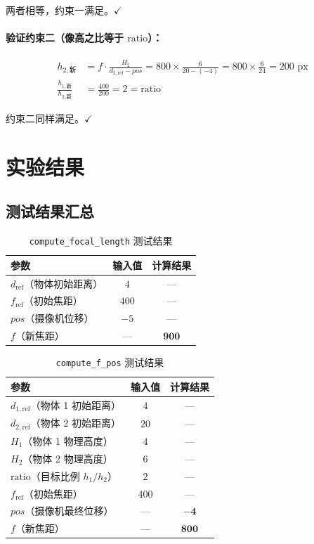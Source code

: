 \documentclass[12pt,a4paper]{ctexart}
\begin{document}
两者相等，约束一满足。$\checkmark$

\paragraph{验证约束二（像高之比等于 $\text{ratio}$）：}

\begin{align}
  h_{2,\text{新}} &= f \cdot \frac{H_2}{d_{2,\text{ref}} - pos} = 800 \times \frac{6}{20-(-4)} = 800 \times \frac{6}{24} = 200 \text{ px} \\
  \frac{h_{1,\text{新}}}{h_{2,\text{新}}} &= \frac{400}{200} = 2 = \text{ratio}
\end{align}

约束二同样满足。$\checkmark$

\section{实验结果}

\subsection{测试结果汇总}

\begin{table}[H]
\centering
\caption{\texttt{compute\_focal\_length} 测试结果}
\label{tab:result1}
\begin{tabular}{lcc}
\toprule
参数 & 输入值 & 计算结果 \\
\midrule
$d_\text{ref}$（物体初始距离） & $4$ & — \\
$f_\text{ref}$（初始焦距） & $400$ & — \\
$pos$（摄像机位移） & $-5$ & — \\
$f$（新焦距） & — & $\mathbf{900}$ \\
\bottomrule
\end{tabular}
\end{table}

\begin{table}[H]
\centering
\caption{\texttt{compute\_f\_pos} 测试结果}
\label{tab:result2}
\begin{tabular}{lcc}
\toprule
参数 & 输入值 & 计算结果 \\
\midrule
$d_{1,\text{ref}}$（物体 1 初始距离） & $4$ & — \\
$d_{2,\text{ref}}$（物体 2 初始距离） & $20$ & — \\
$H_1$（物体 1 物理高度） & $4$ & — \\
$H_2$（物体 2 物理高度） & $6$ & — \\
$\text{ratio}$（目标比例 $h_1/h_2$） & $2$ & — \\
$f_\text{ref}$（初始焦距） & $400$ & — \\
$pos$（摄像机最终位移） & — & $\mathbf{-4}$ \\
$f$（新焦距） & — & $\mathbf{800}$ \\
\bottomrule
\end{tabular}
\end{table}
\end{document}
